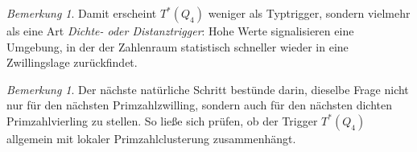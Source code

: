 \documentclass[11pt,a4paper]{article}
\theoremstyle{definition}
\theoremstyle{remark}
\newtheorem{bemerkung}[satz]{Bemerkung}
\begin{document}
	\begin{bemerkung}
		Damit erscheint \(T^*(Q_4)\) weniger als Typtrigger, sondern vielmehr als eine Art
		\emph{Dichte- oder Distanztrigger}: Hohe Werte signalisieren eine Umgebung, in der der
		Zahlenraum statistisch schneller wieder in eine Zwillingslage zurückfindet.
	\end{bemerkung}
	
	\begin{bemerkung}
		Der nächste natürliche Schritt bestünde darin, dieselbe Frage nicht nur für den nächsten
		Primzahlzwilling, sondern auch für den nächsten dichten Primzahlvierling zu stellen. So
		ließe sich prüfen, ob der Trigger \(T^*(Q_4)\) allgemein mit lokaler Primzahlclusterung
		zusammenhängt.
	\end{bemerkung}
	
\end{document}
